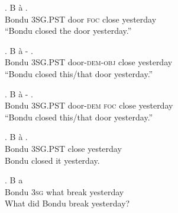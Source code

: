 \documentclass{assets/fieldnotes}
\begin{document}
\exg. B \`a    .\\
Bondu \textsc{3SG.PST} door \textsc{foc} close yesterday\\
``Bondu closed the door yesterday.''

\exg. B \`a -  .\\
Bondu \textsc{3SG.PST} door-\textsc{dem-obj} close yesterday\\
``Bondu closed this/that door yesterday.''

\exg. B \`a -   .\\
Bondu \textsc{3SG.PST} door-\textsc{dem} \textsc{foc} close yesterday\\
``Bondu closed this/that door yesterday.''



\exg. B \`a  .\\
Bondu \textsc{3SG.PST} close yesterday\\
Bondu closed it yesterday.\\


\exg. B a   \\
Bondu \textsc{\textsc{3sg}} what break yesterday\\
What did Bondu break yesterday?
\end{document}
